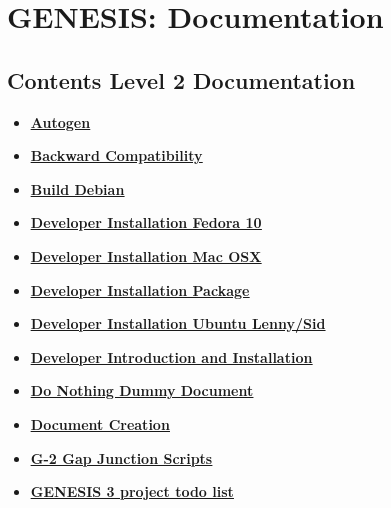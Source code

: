 \documentclass[12pt]{article}
\begin{document}
\section*{GENESIS: Documentation}

\subsection*{Contents Level 2 Documentation}

\begin{itemize}

\item \href{../autogen/autogen.pdf}{\bf \underline{Autogen}}

\item \href{../backward-compatibility/backward-compatibility.pdf}{\bf \underline{Backward Compatibility}}

\item \href{../build-debian/build-debian.pdf}{\bf \underline{Build Debian}}

\item \href{../installation-fedora10/installation-fedora10.pdf}{\bf \underline{Developer Installation Fedora 10}}

\item \href{../installation-osx/installation-osx.pdf}{\bf \underline{Developer Installation Mac OSX}}

\item \href{../developer-package/developer-package.pdf}{\bf \underline{Developer Installation Package}}

\item \href{../installation-ubuntu-lennysid/installation-ubuntu-lennysid.pdf}{\bf \underline{Developer Installation Ubuntu Lenny/Sid}}

\item \href{../developers-intro/developers-intro.pdf}{\bf \underline{Developer Introduction and Installation}}

\item \href{../do-nothing/do-nothing.pdf}{\bf \underline{Do Nothing Dummy Document}}

\item \href{../document-create/document-create.pdf}{\bf \underline{Document Creation}}

\item \href{../g2-gap-junction/g2-gap-junction.pdf}{\bf \underline{G-2 Gap Junction Scripts}}

\item \href{../project-todo/project-todo.pdf}{\bf \underline{GENESIS 3 project todo list}}


\end{itemize}
\end{document}
